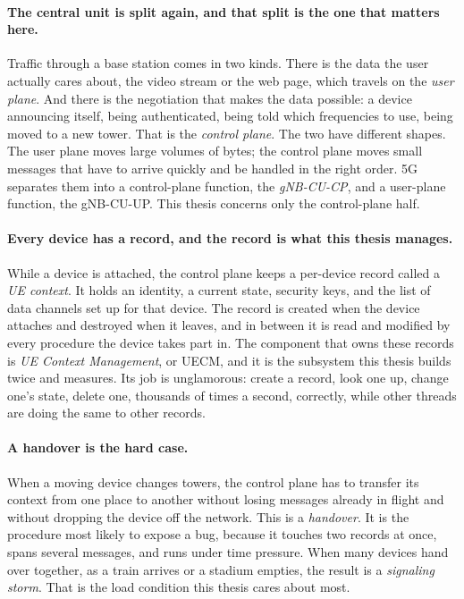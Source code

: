 \documentclass[english,twoside,openright,a4paper,censored,csm,software-track-2020]{HYthesisML}
\begin{document}
\paragraph{The central unit is split again, and that split is the one that matters here.}
Traffic through a base station comes in two kinds. There is the data the user actually cares
about, the video stream or the web page, which travels on the \emph{user plane}. And there is
the negotiation that makes the data possible: a device announcing itself, being authenticated,
being told which frequencies to use, being moved to a new tower. That is the \emph{control
plane}. The two have different shapes. The user plane moves large volumes of bytes; the
control plane moves small messages that have to arrive quickly and be handled in the right
order. 5G separates them into a control-plane function, the \emph{gNB-CU-CP}, and a
user-plane function, the gNB-CU-UP. This thesis concerns only the control-plane half.

\paragraph{Every device has a record, and the record is what this thesis manages.}
While a device is attached, the control plane keeps a per-device record called a \emph{UE
context}. It holds an identity, a current state, security keys, and the list of data channels
set up for that device. The record is created when the device attaches and destroyed when it
leaves, and in between it is read and modified by every procedure the device takes part in.
The component that owns these records is \emph{UE Context Management}, or UECM, and it is the
subsystem this thesis builds twice and measures. Its job is unglamorous: create a record, look
one up, change one's state, delete one, thousands of times a second, correctly, while other
threads are doing the same to other records.

\paragraph{A handover is the hard case.}
When a moving device changes towers, the control plane has to transfer its context from one
place to another without losing messages already in flight and without dropping the device off
the network. This is a \emph{handover}. It is the procedure most likely to expose a bug,
because it touches two records at once, spans several messages, and runs under time pressure.
When many devices hand over together, as a train arrives or a stadium empties, the result is a
\emph{signaling storm}. That is the load condition this thesis cares about most.
\end{document}
